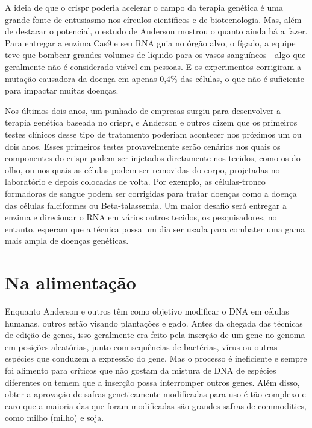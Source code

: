 \documentclass{report}
\begin{document}
A ideia de que o \ac{crispr} poderia acelerar o campo da terapia genética é uma grande fonte de entusiasmo nos círculos científicos e de biotecnologia. Mas, além de destacar o potencial, o estudo de Anderson mostrou o quanto ainda há a fazer. Para entregar a enzima Cas9 e seu RNA guia no órgão alvo, o fígado, a equipe teve que bombear grandes volumes de líquido para os vasos sanguíneos - algo que geralmente não é considerado viável em pessoas. E os experimentos corrigiram a mutação causadora da doença em apenas 0,4\% das células, o que não é suficiente para impactar muitas doenças.

Nos últimos dois anos, um punhado de empresas surgiu para desenvolver a terapia genética baseada no \ac{crispr}, e Anderson e outros dizem que os primeiros testes clínicos desse tipo de tratamento poderiam acontecer nos próximos um ou dois anos. Esses primeiros testes provavelmente serão cenários nos quais os componentes do \ac{crispr} podem ser injetados diretamente nos tecidos, como os do olho, ou nos quais as células podem ser removidas do corpo, projetadas no laboratório e depois colocadas de volta. Por exemplo, as células-tronco formadoras de sangue podem ser corrigidas para tratar doenças como a doença das células falciformes ou Beta-talassemia. 
Um maior desafio será entregar a enzima e direcionar o RNA em vários outros tecidos, os pesquisadores, no entanto, esperam que a técnica possa um dia ser usada para combater
 uma gama mais ampla de doenças genéticas.

\section{Na alimentação}
Enquanto Anderson e outros têm como objetivo modificar o DNA em células humanas, outros estão visando plantações e gado. Antes da chegada das técnicas de edição de genes, isso geralmente era feito pela inserção de um gene no genoma em posições aleatórias, junto com sequências de bactérias, vírus ou outras espécies que conduzem a expressão do gene. Mas o processo é ineficiente e sempre foi alimento para críticos que não gostam da mistura de DNA de espécies diferentes ou temem que a inserção possa interromper outros genes. Além disso, obter a aprovação de safras geneticamente modificadas para uso é tão complexo e caro que a maioria das que foram modificadas são grandes safras de commodities, como milho (milho) e soja.
\end{document}
